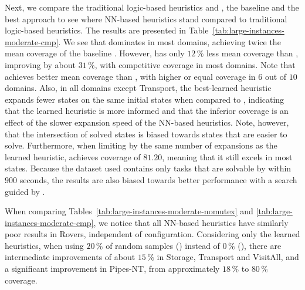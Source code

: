 Next, we compare the traditional logic-based heuristics \hff and \hgc, the baseline \hnnbase and the best approach \hnnrs to see where NN-based heuristics stand compared to traditional logic-based heuristics. The results are presented in Table~\ref{tab:large-instances-moderate-cmp}.
We see that \hff dominates in most domains, achieving twice the mean coverage of the baseline \hnnbase. However, \hnnrs has only $12\,\%$ less mean coverage than \hff, improving \hnnbase by about $31\,\%$, with competitive coverage in most domains. Note that \hnnrs achieves better mean coverage than \hgc, with higher or equal coverage in $6$ out of $10$ domains. Also, in all domains except Transport, the best-learned heuristic expands fewer states on the same initial states when compared to \hff, indicating that the learned heuristic is more informed and that the inferior coverage is an effect of the slower expansion speed of the NN-based heuristics. Note, however, that the intersection of solved states is biased towards states that are easier to solve. Furthermore, when limiting \hff by the same number of expansions as the learned heuristic, \hff achieves coverage of $81.20$, meaning that it still excels in most states. Because the dataset used contains only tasks that are solvable by \hff within $900$ seconds, the results are also biased towards better performance with a search guided by \hff. 



When comparing Tables~\ref{tab:large-instances-moderate-nomutex} and \ref{tab:large-instances-moderate-cmp}, we notice that all NN-based heuristics have similarly poor results in Rovers, independent of configuration. Considering only the learned heuristics, when using $20\,\%$ of random samples (\hnnrs) instead of $0\,\%$ (\hnnbfsrwl{\meanfx}), there are intermediate improvements of about $15\,\%$ in Storage, Transport and VisitAll, and a significant improvement in Pipes-NT, from approximately $18\,\%$ to $80\,\%$ coverage.
